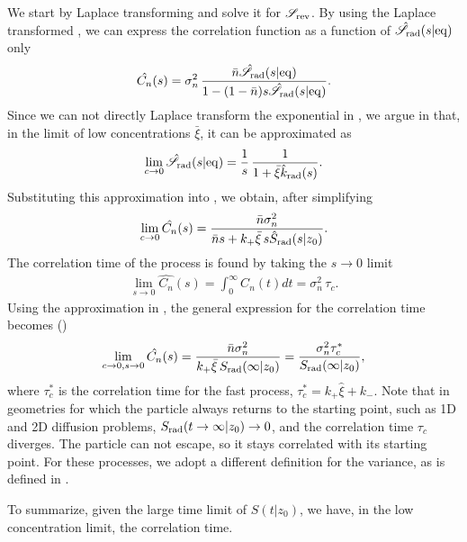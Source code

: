 We start by Laplace transforming  and solve it for $\mathscr{S}_{\rm rev}$. By using the Laplace transformed , we can express the correlation function as a function of $\hat{\mathscr{S}}_{\rm rad}(s|{\rm eq})$ only
\begin{equation}
 \hat{C_n}(s) = \sigma_n^2 \, \frac{\bar{n} \hat{\mathscr{S}}_{\rm rad}(s|{\rm eq})}{1-(1-\bar{n})s\hat{\mathscr{S}}_{\rm rad}(s|{\rm eq})}.
 \elabel{LapCorr}
\end{equation}
Since we can not directly Laplace transform the exponential in , we argue in  that, in the limit of low concentrations $\bar{\xi}$, it can be approximated as
\begin{equation}
 \lim_{c\to0} \hat{\mathscr{S}}_{\rm rad}(s|{\rm eq}) = \frac{1}{s}  \, \frac{1}{ 1 + \bar{\xi} \hat{k}_{\rm rad}(s)}.
 \elabel{Seq_approx}
\end{equation}
Substituting this approximation into , we obtain, after simplifying
\begin{equation}
 \lim_{c \to 0} \hat{C_n}(s) = \frac{\bar{n} \sigma_n^2}{\bar{n} s + k_+ \bar{\xi} \, s \hat{S}_{\rm rad}(s|z_0)}.
 \elabel{Corr_approx}
\end{equation}
The correlation time of the process is found by taking the $s \to 0$ limit
\begin{eqnarray}
 \lim_{s \to 0} \hat{C_n}(s) = \int_0^\infty C_n(t) dt = \sigma_n^2 \, \tau_c.
\end{eqnarray}
Using the approximation in , the general expression for the correlation time becomes ()
\begin{equation}
 \lim_{c \to 0, s \to 0} \hat{C_n}(s) = \frac{\bar{n} \sigma_n^2}{k_+ \bar{\xi} \, S_{\rm rad}(\infty|z_0)} = \frac{\sigma_n^2 \tau_c^*}{S_{\rm rad}(\infty|z_0)},
 \elabel{CT1}
\end{equation}
where $\tau_c^*$ is the correlation time for the fast process, $\tau_c^* = k_+ \hat{\xi} + k_-$. Note that in geometries for which the particle always returns to the starting point, such as 1D and 2D diffusion problems, $S_{\rm rad}(t\to\infty|z_0)\to0$, and the correlation time $\tau_c$ diverges. The particle can not escape, so it stays correlated with its starting point. For these processes, we adopt a different definition for the variance, as is defined in .

To summarize, given the large time limit of $S(t|z_0)$, we have, in the low concentration limit, the correlation time.


